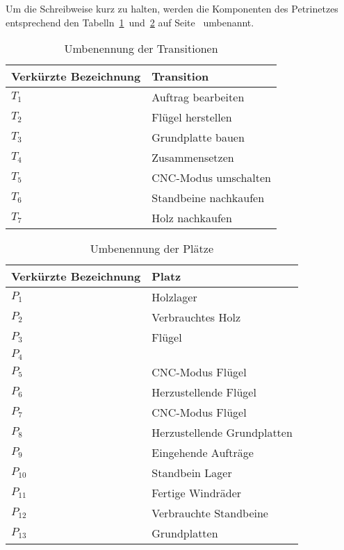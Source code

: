 Um die Schreibweise kurz zu halten, werden die Komponenten des Petrinetzes entsprechend den Tabelln~\ref{tab:rename_transitions}~und~\ref{tab:rename_places} auf Seite~\pageref{tab:rename_transitions} umbenannt.

\begin{table}[p]
\begin{tabularx}{\textwidth}{|p{5cm}|X|}
	\hline
	\textbf{Verkürzte Bezeichnung} & \textbf{Transition} \\ \hline
	$T_1$	& Auftrag bearbeiten		\\ \hline
	$T_2$	& Flügel herstellen			\\ \hline
	$T_3$	& Grundplatte bauen			\\ \hline
	$T_4$	& Zusammensetzen			\\ \hline
	$T_5$	& CNC-Modus umschalten		\\ \hline
	$T_6$	& Standbeine nachkaufen		\\ \hline
	$T_7$	& Holz nachkaufen			\\ \hline
\end{tabularx}
\caption{Umbenennung der Transitionen}
\label{tab:rename_transitions}
\end{table}
\begin{table}[p]
\begin{tabularx}{\textwidth}{|p{5cm}|X|}
	\hline
	\textbf{Verkürzte Bezeichnung} & \textbf{Platz} \\ \hline
	$P_1$		& Holzlager						\\ \hline
	$P_2$		& Verbrauchtes Holz				\\ \hline
	$P_3$		& Flügel						\\ \hline
	$P_4$		& 								\\ \hline
	$P_5$		& CNC-Modus Flügel				\\ \hline
	$P_6$		& Herzustellende Flügel			\\ \hline
	$P_7$		& CNC-Modus Flügel				\\ \hline
	$P_8$		& Herzustellende Grundplatten	\\ \hline
	$P_9$		& Eingehende Aufträge			\\ \hline
	$P_{10}$	& Standbein Lager				\\ \hline
	$P_{11}$	& Fertige Windräder				\\ \hline
	$P_{12}$	& Verbrauchte Standbeine		\\ \hline
	$P_{13}$	& Grundplatten					\\ \hline
\end{tabularx}
\caption{Umbenennung der Plätze}
\label{tab:rename_places}
\end{table}

